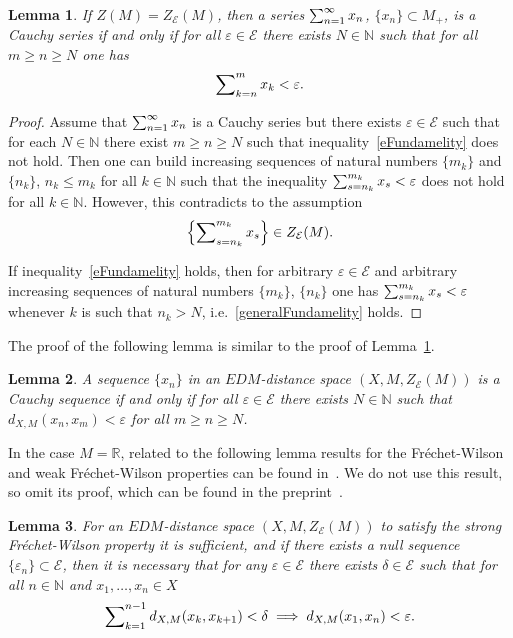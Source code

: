 \documentclass[12pt]{amsart}          %
\newtheorem{lemma}{Lemma}
\newcommand{\RR}{\mathbb R}
\newcommand{\NN}{\mathbb N}
\newcommand{\EE}{\mathcal{E}}
\begin{document}
\begin{lemma}\label{l::eCauchySeries}
If $Z(M) = Z_{\EE}(M)$, then a series $\sum\nolimits\nolimits_{n=1}^\infty x_n$, $\{x_n\}\subset M_+$, is a Cauchy series if and only if for all $\varepsilon\in \EE$ there exists $N\in\NN$ such that for all $m\geq n\geq N$ one has
\begin{equation}\label{eFundamelity}
    \sum\nolimits\nolimits_{k=n}^m x_k < \varepsilon.
\end{equation}
\end{lemma}
\begin{proof}
Assume that $\sum\nolimits\nolimits_{n=1}^\infty x_n$ is a Cauchy series but there exists $\varepsilon\in\EE$ such that for each $N\in\NN$ there exist $m\geq n\geq N$ such that   inequality~\eqref{eFundamelity} does not hold. Then one can build increasing sequences of natural numbers $\{m_k\}$ and $\{n_k\}$, $n_k\leq m_k$ for all $k\in \NN$ such that the inequality  $ \sum\nolimits\nolimits_{s=n_k}^{m_k} x_s < \varepsilon$ does not hold for all $k\in\NN$. However, this contradicts to the assumption 
\begin{equation}\label{generalFundamelity}
 \left\{\sum\nolimits\nolimits_{s=n_k}^{m_k} x_s\right\}\in Z_{\EE}(M).   
\end{equation}

If inequality~\eqref{eFundamelity} holds, then for arbitrary $\varepsilon\in \EE$ and arbitrary increasing sequences of natural numbers $\{m_k\}$, $\{n_k\}$ one has $\sum\nolimits\nolimits_{s=n_k}^{m_k} x_s<\varepsilon$ whenever $k$ is such that  $n_k>N$, i.e.~\eqref{generalFundamelity} holds.
 \end{proof}
The proof of the following lemma is similar to the proof of Lemma~\ref{l::eCauchySeries}.
 \begin{lemma}\label{l::eCauchySequence}
 A sequence $\{x_n\}$ in an $EDM$-distance space $(X, M, Z_{\EE}(M))$ is a Cauchy sequence if and only if for all $\varepsilon\in\EE$ there exists $N\in\NN$ such that $d_{X,M}(x_n,x_m)<\varepsilon$ for all $m\geq n\geq N$.
 \end{lemma}
In the case $M= \RR$, related to the following lemma results for the Fr\'{e}chet-Wilson and weak Fr\'{e}chet-Wilson properties can be found in~\cite{Wilson}. We do not use this result, so omit its proof, which can be found in the preprint~\cite{fmDistSpaces}.
 \begin{lemma}
 For an $EDM$-distance space $(X, M, Z_{\EE}(M))$ to satisfy the strong Fr\'{e}chet-Wilson property it is sufficient, and  if there exists a null sequence $\{\varepsilon_n\}\subset\EE$,
 then it is necessary that for any $\varepsilon\in \mathcal{E}$ there exists $\delta\in\mathcal{E}$ such that for all $n\in\NN$ and $x_1,\ldots, x_n\in X$ 
$$
\sum\nolimits\nolimits_{k=1}^{n-1} d_{X,M}(x_k,x_{k+1})< \delta \implies d_{X,M}(x_1,x_n)< \varepsilon.
$$
 \end{lemma}
\end{document}
